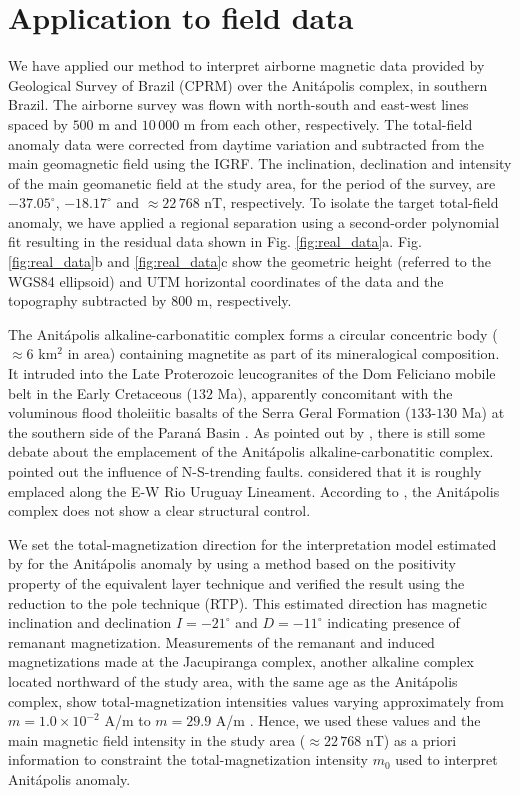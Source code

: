 \section{Application to field data}

We have applied our method to interpret airborne magnetic data provided by 
Geological Survey of Brazil (CPRM) over the Anit{\'a}polis complex, 
in southern Brazil. 
The airborne survey was flown with north-south and east-west lines spaced by $500$ m and $10\,000$ m from each other, respectively. 
The total-field anomaly data were corrected from daytime variation and 
subtracted from the main geomagnetic field using the IGRF. 
The inclination, declination and intensity of the main geomanetic field at the study area, 
for the period of the survey, are $-37.05^{\circ}$, $-18.17^{\circ}$ and 
$\approx 22 \, 768 $ nT, respectively.
To isolate the target total-field anomaly, we have applied 
a regional separation using a second-order polynomial fit resulting in the residual data shown in Fig. \ref{fig:real_data}a. 
Fig. \ref{fig:real_data}b and \ref{fig:real_data}c show the geometric height (referred to the WGS84 ellipsoid) and UTM horizontal coordinates of the data and the topography subtracted by $ 800 $ m, respectively. 

The Anit{\'a}polis alkaline-carbonatitic complex forms a circular concentric body 
($\approx 6$ km$^{2}$ in area) containing magnetite as part of its mineralogical 
composition. It intruded into the Late Proterozoic leucogranites of the Dom Feliciano 
mobile belt in the Early Cretaceous ($132$ Ma), apparently concomitant with the 
voluminous flood tholeiitic basalts of the Serra Geral Formation ($133$-$130$ Ma) 
at the southern side of the Paran{\'a} Basin \citep{gibson-1999, scheibe-etal2005}.
As pointed out by \citet{GOMES2018}, there is still some debate about the emplacement 
of the Anit{\'a}polis alkaline-carbonatitic complex. 
\citet{melcher-coutinho1966} pointed out the influence of N-S-trending faults. 
\citet{scheibe-etal2005} considered that it is roughly emplaced along the E-W Rio 
Uruguay Lineament. According to \citet{riccomini-etal2005}, the Anit{\'a}polis 
complex does not show a clear structural control. 

We set the total-magnetization direction for the interpretation model estimated by \cite{reis-seg-2019} for the Anitápolis anomaly by using a method based on the positivity property of the equivalent layer technique \cite[]{dampney1969,emilia1973} and verified the 
result using the reduction to the pole technique (RTP). This estimated direction has magnetic inclination and declination $ I=-21^\circ $ and $ D=-11^\circ $ indicating presence of remanant magnetization.
Measurements of the remanant and induced magnetizations made at the Jacupiranga complex,
another alkaline complex located northward of the study area, 
with the same age as the Anit{\'a}polis complex, 
show total-magnetization intensities values varying approximately from $m = 1.0 \times 10^{-2}$ A/m to 
$m = 29.9$ A/m \citep[][ tb. 1]{valdivia-2009}.
Hence, we used these values and the main magnetic field intensity in the study area 
($\approx 22 \, 768 $ nT) as a priori information to constraint the 
total-magnetization intensity $m_{0}$ used to interpret Anit{\'a}polis anomaly.

